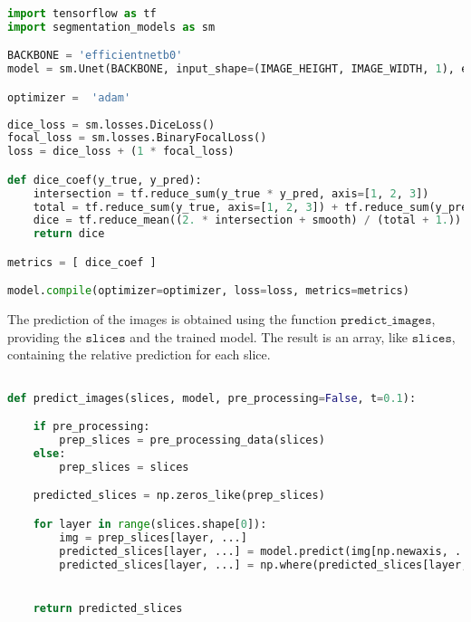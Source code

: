 \documentclass{standalone}
\begin{document}
\begin{lstlisting}[language = python, caption=model implementation]
import tensorflow as tf
import segmentation_models as sm

BACKBONE = 'efficientnetb0'
model = sm.Unet(BACKBONE, input_shape=(IMAGE_HEIGHT, IMAGE_WIDTH, 1), encoder_weights=None, activation='sigmoid')

optimizer =  'adam'
    
dice_loss = sm.losses.DiceLoss()
focal_loss = sm.losses.BinaryFocalLoss()
loss = dice_loss + (1 * focal_loss)

def dice_coef(y_true, y_pred):
    intersection = tf.reduce_sum(y_true * y_pred, axis=[1, 2, 3])
    total = tf.reduce_sum(y_true, axis=[1, 2, 3]) + tf.reduce_sum(y_pred, axis=[1, 2, 3])
    dice = tf.reduce_mean((2. * intersection + smooth) / (total + 1.))
    return dice

metrics = [ dice_coef ]

model.compile(optimizer=optimizer, loss=loss, metrics=metrics)

\end{lstlisting}
The prediction of the images is obtained using the function $\mathtt{predict\_images}$,
providing the $\mathtt{slices}$ and the trained model. 
The result is an array, like $\mathtt{slices}$, containing the relative prediction for each slice.
\begin{lstlisting}[language = python, caption=prediction function implementation]

def predict_images(slices, model, pre_processing=False, t=0.1):

    if pre_processing:
        prep_slices = pre_processing_data(slices)
    else:
        prep_slices = slices

    predicted_slices = np.zeros_like(prep_slices)

    for layer in range(slices.shape[0]):
        img = prep_slices[layer, ...]
        predicted_slices[layer, ...] = model.predict(img[np.newaxis, ...])[...]
        predicted_slices[layer, ...] = np.where(predicted_slices[layer, ...] <= 0.1, 0, predicted_slices[layer, ...])


    return predicted_slices


\end{lstlisting}
\end{document}
